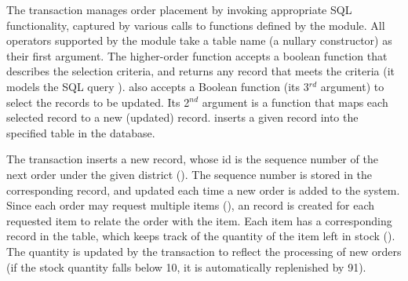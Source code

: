 The transaction manages order placement by invoking appropriate SQL
functionality, captured by various calls to functions defined by the
 module. All  operators supported by the module take a
table name (a nullary constructor) as their first argument. The
higher-order  function accepts a boolean function that
describes the selection criteria, and returns any record that meets
the criteria (it models the SQL query \C{SELECT \ldots\xspace LIMIT
  1}).  also accepts a Boolean function (its 3$^{rd}$
argument) to select the records to be updated. Its 2$^{nd}$ argument
is a function that maps each selected record to a new (updated)
record.  inserts a given record into the specified table
in the database.

The  transaction inserts a new  record, whose
id is the sequence number of the next order under the given district
(). The sequence number is stored in the corresponding
 record, and updated each time a new order is added to the
system. Since each order may request multiple items (),
an  record is created for each requested item to relate
the order with the item. Each item has a corresponding record in the
 table, which keeps track of the quantity of the item left in
stock (). The quantity is updated by the transaction to
reflect the processing of new orders (if the stock quantity falls below
10, it is automatically replenished by 91).

